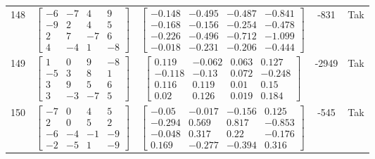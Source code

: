 \documentclass[a4paper,12pt]{article}
\begin{document}
\begin{tabular}{c c c c c}
148
&
$\begin{bmatrix} -6 & -7 & 4 & 9 \\ -9 & 2 & 4 & 5 \\ 2 & 7 & -7 & 6 \\ 4 & -4 & 1 & -8 \end{bmatrix}$
&
$\begin{bmatrix} -0.148 & -0.495 & -0.487 & -0.841 \\ -0.168 & -0.156 & -0.254 & -0.478 \\ -0.226 & -0.496 & -0.712 & -1.099 \\ -0.018 & -0.231 & -0.206 & -0.444 \end{bmatrix}$
&
-831
&
Tak
\\
149
&
$\begin{bmatrix} 1 & 0 & 9 & -8 \\ -5 & 3 & 8 & 1 \\ 3 & 9 & 5 & 6 \\ 3 & -3 & -7 & 5 \end{bmatrix}$
&
$\begin{bmatrix} 0.119 & -0.062 & 0.063 & 0.127 \\ -0.118 & -0.13 & 0.072 & -0.248 \\ 0.116 & 0.119 & 0.01 & 0.15 \\ 0.02 & 0.126 & 0.019 & 0.184 \end{bmatrix}$
&
-2949
&
Tak
\\
150
&
$\begin{bmatrix} -7 & 0 & 4 & 5 \\ 2 & 0 & 5 & 2 \\ -6 & -4 & -1 & -9 \\ -2 & -5 & 1 & -9 \end{bmatrix}$
&
$\begin{bmatrix} -0.05 & -0.017 & -0.156 & 0.125 \\ -0.294 & 0.569 & 0.817 & -0.853 \\ -0.048 & 0.317 & 0.22 & -0.176 \\ 0.169 & -0.277 & -0.394 & 0.316 \end{bmatrix}$
&
-545
&
Tak
\\
\end{tabular} \egroup \newpage
\end{document}
